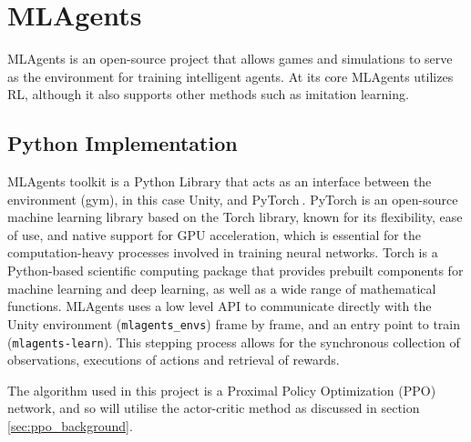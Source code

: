 \section{MLAgents}
MLAgents is an open-source project that allows games and simulations to serve as the environment for training intelligent agents. At its core MLAgents utilizes RL, although it also supports other methods such as imitation learning.

\subsection{Python Implementation}


MLAgents toolkit is a Python Library that acts as an interface between the environment (gym), in this case Unity, and PyTorch$~$\cite{paszke2019pytorch}. PyTorch is an open-source machine learning library based on the Torch library, known for its flexibility, ease of use, and native support for GPU acceleration, which is essential for the computation-heavy processes involved in training neural networks. Torch is a Python-based scientific computing package that provides prebuilt components for machine learning and deep learning, as well as a wide range of mathematical functions. MLAgents uses a low level API to communicate directly with the Unity environment (\texttt{mlagents\_envs}) frame by frame, and an entry point to train (\texttt{mlagents-learn}). This stepping process allows for the synchronous collection of observations, executions of actions and retrieval of rewards. 


The algorithm used in this project is a Proximal Policy Optimization (PPO) network, and so will utilise the actor-critic method as discussed in section$~$\ref{sec:ppo_background}.

